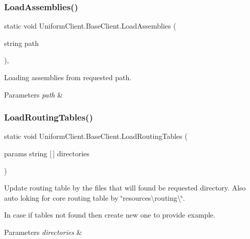 \subsubsection{\texorpdfstring{Load\+Assemblies()}{LoadAssemblies()}}
{\footnotesize\ttfamily static void Uniform\+Client.\+Base\+Client.\+Load\+Assemblies (\begin{DoxyParamCaption}\item[{string}]{path }\end{DoxyParamCaption})\hspace{0.3cm}{\ttfamily [static]}, {\ttfamily [protected]}}



Loading assemblies from requested path. 


\begin{DoxyParams}{Parameters}
{\em path} & \\
\hline
\end{DoxyParams}
\mbox{\label{class_uniform_client_1_1_base_client_a5f8f22aa4ab8219fb5f1b6a358f68daf}} 
\subsubsection{\texorpdfstring{Load\+Routing\+Tables()}{LoadRoutingTables()}}
{\footnotesize\ttfamily static void Uniform\+Client.\+Base\+Client.\+Load\+Routing\+Tables (\begin{DoxyParamCaption}\item[{params string \mbox{[}$\,$\mbox{]}}]{directories }\end{DoxyParamCaption})\hspace{0.3cm}{\ttfamily [static]}}



Update routing table by the files that will found be requested directory. Also auto loking for core routing table by \char`\"{}resources\textbackslash{}routing\textbackslash{}\char`\"{}. 

In case if tables not found then create new one to provide example. 


\begin{DoxyParams}{Parameters}
{\em directories} & \\
\hline
\end{DoxyParams}
\mbox{\label{class_uniform_client_1_1_base_client_a56ba8d0360e3c65a69d2d69db878ec23}} 
